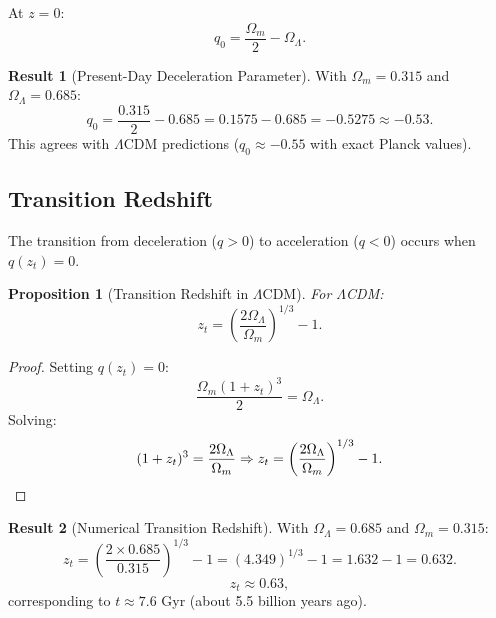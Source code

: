 \documentclass[11pt,a4paper]{article}
\newcommand{\OmegaLam}{\ensuremath{\Omega_\Lambda}}
\newcommand{\OmegaM}{\ensuremath{\Omega_m}}
\newtheorem{proposition}[theorem]{Proposition}
\theoremstyle{definition}
\newtheorem{result}{Result}
\theoremstyle{remark}
\begin{document}
At $z = 0$:
\begin{equation}
\label{eq:q0_LCDM}
q_0 = \frac{\OmegaM}{2} - \OmegaLam.
\end{equation}

\begin{result}[Present-Day Deceleration Parameter]
\label{result:q0}
With $\OmegaM = 0.315$ and $\OmegaLam = 0.685$:
\begin{equation}
\boxed{q_0 = \frac{0.315}{2} - 0.685 = 0.1575 - 0.685 = -0.5275 \approx -0.53.}
\end{equation}
This agrees with $\Lambda$CDM predictions ($q_0 \approx -0.55$ with exact Planck values).
\end{result}

\subsection{Transition Redshift}
\label{sec:transition}

The transition from deceleration ($q > 0$) to acceleration ($q < 0$) occurs when $q(z_t) = 0$.

\begin{proposition}[Transition Redshift in $\Lambda$CDM]
\label{prop:z_transition}
For $\Lambda$CDM:
\begin{equation}
\label{eq:z_transition}
\boxed{z_t = \left(\frac{2\OmegaLam}{\OmegaM}\right)^{1/3} - 1.}
\end{equation}
\end{proposition}

\begin{proof}
Setting $q(z_t) = 0$:
\begin{equation}
\frac{\OmegaM(1+z_t)^3}{2} = \OmegaLam.
\end{equation}
Solving:
\begin{equation}
(1+z_t)^3 = \frac{2\OmegaLam}{\OmegaM} \Rightarrow z_t = \left(\frac{2\OmegaLam}{\OmegaM}\right)^{1/3} - 1. \qedhere
\end{equation}
\end{proof}

\begin{result}[Numerical Transition Redshift]
\label{result:z_t}
With $\OmegaLam = 0.685$ and $\OmegaM = 0.315$:
\begin{equation}
z_t = \left(\frac{2 \times 0.685}{0.315}\right)^{1/3} - 1 = (4.349)^{1/3} - 1 = 1.632 - 1 = 0.632.
\end{equation}
\begin{equation}
\boxed{z_t \approx 0.63,}
\end{equation}
corresponding to $t \approx 7.6$ Gyr (about 5.5 billion years ago).
\end{result}
\end{document}
